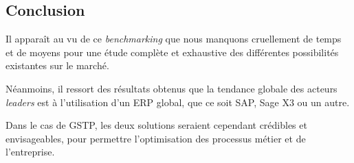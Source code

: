 \subsection{Conclusion}

Il apparaît au vu de ce {\sl benchmarking} que nous manquons
cruellement de temps et de moyens pour une étude complète
et exhaustive des différentes possibilités existantes sur le
marché.

Néanmoins, il ressort des résultats obtenus que la tendance
globale des acteurs {\sl leaders} est à l'utilisation d'un
ERP global, que ce soit SAP, Sage X3 ou un autre.

Dans le cas de GSTP, les deux solutions seraient cependant
crédibles et envisageables, pour permettre l'optimisation des
processus métier et de l'entreprise.
